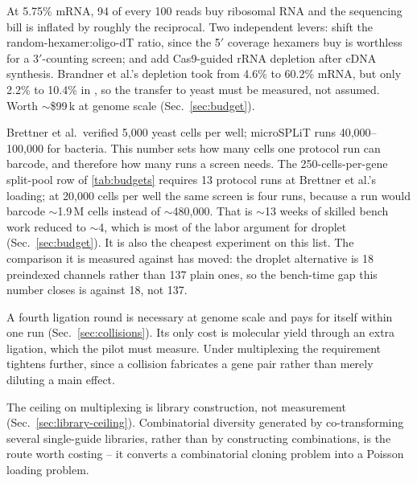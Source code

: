  At 5.75\% mRNA, 94 of every 100 reads buy ribosomal RNA
and the sequencing bill is inflated by roughly the reciprocal. Two independent
levers: shift the random-hexamer:oligo-dT ratio, since the 5$'$ coverage hexamers
buy is worthless for a 3$'$-counting screen; and add Cas9-guided rRNA depletion
after cDNA synthesis. Brandner et al.'s depletion took  from 4.6\% to
60.2\% mRNA, but only 2.2\% to 10.4\% in , so the transfer to
yeast must be measured, not assumed. Worth $\sim$\$99\,k at genome scale
(Sec.~\ref{sec:budget}).

 Brettner et al.\ verified 5{,}000 yeast cells per
well; microSPLiT runs 40{,}000--100{,}000 for bacteria. This number sets how many
cells one protocol run can barcode, and therefore how many runs a screen needs.
The 250-cells-per-gene split-pool row of \cref{tab:budgets} requires 13 protocol
runs at Brettner et al.'s loading; at 20{,}000 cells per well the same screen is
four runs, because a run would barcode $\sim$1.9\,M cells instead of
$\sim$480{,}000. That is $\sim$13 weeks of skilled bench work reduced to
$\sim$4, which is most of the labor argument for droplet
(Sec.~\ref{sec:budget}). It is also the cheapest experiment on this list. The
comparison it is measured against has moved: the droplet alternative is 18
preindexed channels rather than 137 plain ones, so the bench-time gap this
number closes is against 18, not 137.

 A fourth ligation round is necessary at genome scale and
pays for itself within one run (Sec.~\ref{sec:collisions}). Its only cost is
molecular yield through an extra ligation, which the pilot must measure. Under
multiplexing the requirement tightens further, since a collision fabricates a gene
pair rather than merely diluting a main effect.

 The ceiling on multiplexing is library
construction, not measurement (Sec.~\ref{sec:library-ceiling}). Combinatorial
diversity generated by co-transforming several single-guide libraries, rather than
by constructing combinations, is the route worth costing -- it converts a
combinatorial cloning problem into a Poisson loading problem.

